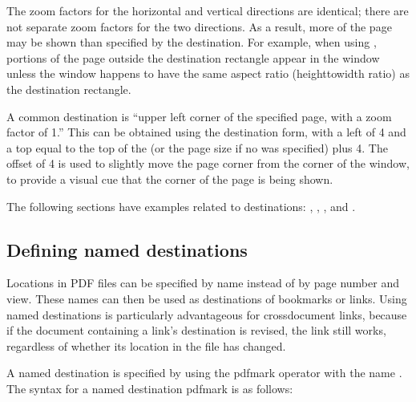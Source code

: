 \documentclass[letterpaper,12pt,english,openany,oneside]{sphinxmanual}
\begin{document}
The zoom factors for the horizontal and vertical directions are identical; there are not separate zoom factors for the two directions. As a result, more of the page may be shown than specified by the destination. For example, when using  , portions of the page outside the destination rectangle appear in the window unless the window happens to have the same aspect ratio (height\sphinxhyphen{}to\sphinxhyphen{}width ratio) as the destination rectangle.

A common destination is “upper left corner of the specified page, with a zoom factor of 1.” This can be obtained using the  destination form, with a left of \sphinxhyphen{}4 and a top equal to the top of the  (or the page size if no  was specified) plus 4. The offset of 4 is used to slightly move the page corner from the corner of the window, to provide a visual cue that the corner of the page is being shown.

The following sections have examples related to destinations: , , , and .


\subsection{Defining named destinations}
\label{\detokenize{pdfmark_Actions:defining-named-destinations}}
Locations in PDF files can be specified by name instead of by page number and view. These names can then be used as destinations of bookmarks or links. Using named destinations is particularly advantageous for cross\sphinxhyphen{}document links, because if the document containing a link’s destination is revised, the link still works, regardless of whether its location in the file has changed.

A named destination is specified by using the pdfmark operator with the name  . The syntax for a named destination pdfmark is as follows:

\begin{sphinxVerbatim}[commandchars=\\\{\}]
 \PYG{p}{[} 



         
\end{sphinxVerbatim}
\end{document}
